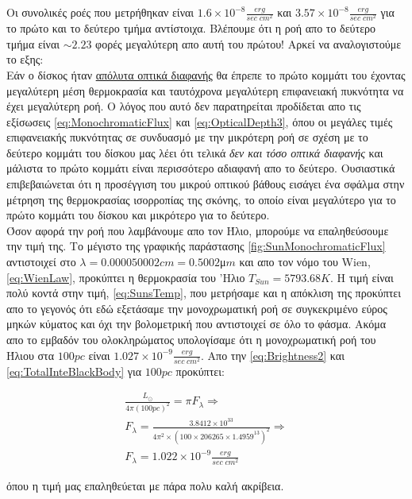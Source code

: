 Οι συνολικές ροές που μετρήθηκαν είναι $1.6\times10^{-8} \frac{erg}{sec \; cm^2}$ και $3.57\times10^{-8} \frac{erg}{sec \; cm^2}$ για το πρώτο και το δεύτερο τμήμα αντίστοιχα. Βλέπουμε ότι η ροή απο το δεύτερο τμήμα είναι $\sim2.23$ φορές μεγαλύτερη απο αυτή του πρώτου! Αρκεί να αναλογιστούμε το εξης:\\

Εάν ο δίσκος ήταν \underline{απόλυτα οπτικά διαφανής} θα έπρεπε το πρώτο κομμάτι του έχοντας μεγαλύτερη μέση θερμοκρασία και ταυτόχρονα μεγαλύτερη επιφανειακή πυκνότητα να έχει μεγαλύτερη ροή. Ο λόγος που αυτό δεν παρατηρείται προδίδεται απο τις εξίσωσεις \ref{eq:MonochromaticFlux} και \ref{eq:OpticalDepth3}, όπου οι μεγάλες τιμές επιφανειακής πυκνότητας σε συνδυασμό με την μικρότερη ροή σε σχέση με το δεύτερο κομμάτι του δίσκου μας λέει ότι τελικά {\it δεν και τόσο οπτικά διαφανής} και μάλιστα το πρώτο κομμάτι είναι περισσότερο αδιαφανή απο το δεύτερο. Ουσιαστικά επιβεβαιώνεται ότι η προσέγγιση του μικρού οπτικού βάθους εισάγει ένα σφάλμα στην μέτρηση της θερμοκρασίας ισορροπίας της σκόνης, το οποίο είναι μεγαλύτερο για το πρώτο κομμάτι του δίσκου και μικρότερο για το δεύτερο.\\

Όσον αφορά την ροή που λαμβάνουμε απο τον Ήλιο, μπορούμε να επαληθεύσουμε την τιμή της. Το μέγιστο της γραφικής παράστασης \ref{fig:SunMonochromaticFlux} αντιστοιχεί στο $\lambda = 0.000050002 cm = 0.5002$μ$m$ και απο τον νόμο του {\en Wien}, \eqref{eq:WienLaw},  προκύπτει η θερμοκρασία του 'Ηλιο $T_{Sun}= 5793.68 K$. Η τιμή είναι πολύ κοντά στην τιμή, \ref{eq:SunsTemp}, που μετρήσαμε και η απόκλιση της προκύπτει απο το γεγονός ότι εδώ εξετάσαμε την μονοχρωματική ροή σε συγκεκριμένο εύρος μηκών κύματος και όχι την βολομετρική που αντιστοιχεί σε όλο το φάσμα. Ακόμα απο το εμβαδόν του ολοκληρώματος υπολογίσαμε ότι η μονοχρωματική ροή του Ήλιου στα $100pc$ είναι $1.027\times10^{-9} \frac{erg}{sec \; cm^2}$. Απο την \ref{eq:Brightness2} και \ref{eq:TotalInteBlackBody} για $100pc$ προκύπτει:

\begin{align*}
\frac{L_\odot}{4\pi (100 pc)^2} = \pi F_\lambda \Rightarrow\\
F_\lambda = \frac{3.8412 \times 10^{33}}{4\pi^2\times(100\times206265\times1.4959^{13})^2} \Rightarrow\\
F_\lambda = 1.022\times10^{-9} \frac{erg}{sec \; cm^2}
\end{align*}

όπου η τιμή μας επαληθεύεται με πάρα πολυ καλή ακρίβεια. \\

